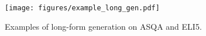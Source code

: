 \begin{figure}[h]
\centering
\texttt{[image: figures/example\_long\_gen.pdf]}
\vspace{-2em}
\caption{Examples of long-form generation on ASQA and ELI5.}
\label{fig:example_long}
\end{figure}
